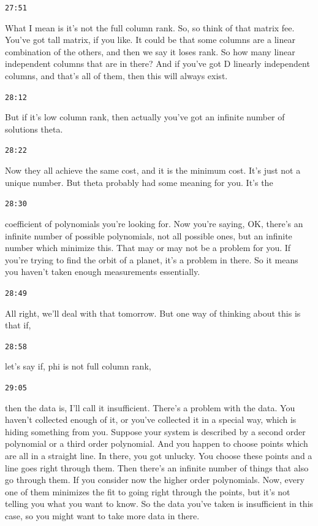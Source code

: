 \documentclass[11pt,a4paper]{article}
\newcommand{\timestamp}[1]{%
  \par\vspace{0.35em}%
  \noindent\colorbox{timestampback}{\textcolor{timestampblue}{\small\texttt{#1}}}%
  \par\vspace{0.2em}%
}
\begin{document}
\timestamp{27:51}

What I mean is it's not the full column rank. So, so think of that matrix fee. You've got tall matrix, if you like. It could be that some columns are a linear combination of the others, and then we say it loses rank. So how many linear independent columns that are in there? And if you've got D linearly independent columns, and that's all of them, then this will always exist.



\timestamp{28:12}

But if it's low column rank, then actually you've got an infinite number of solutions theta.



\timestamp{28:22}

Now they all achieve the same cost, and it is the minimum cost. It's just not a unique number. But theta probably had some meaning for you. It's the



\timestamp{28:30}

coefficient of polynomials you're looking for. Now you're saying, OK, there's an infinite number of possible polynomials, not all possible ones, but an infinite number which minimize this. That may or may not be a problem for you. If you're trying to find the orbit of a planet, it's a problem in there. So it means you haven't taken enough measurements essentially.



\timestamp{28:49}

All right, we'll deal with that tomorrow. But one way of thinking about this is that if,



\timestamp{28:58}

let's say if, phi is not full column rank,



\timestamp{29:05}

then the data is, I'll call it insufficient. There's a problem with the data. You haven't collected enough of it, or you've collected it in a special way, which is hiding something from you. Suppose your system is described by a second order polynomial or a third order polynomial. And you happen to choose points which are all in a straight line. In there, you got unlucky. You choose these points and a line goes right through them. Then there's an infinite number of things that also go through them. If you consider now the higher order polynomials. Now, every one of them minimizes the fit to going right through the points, but it's not telling you what you want to know. So the data you've taken is insufficient in this case, so you might want to take more data in there.
\end{document}
